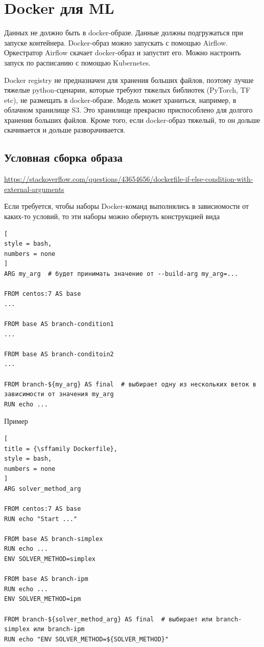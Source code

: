 \documentclass[%
	11pt,
	a4paper,
	utf8,
		]{article}
\begin{document}
\section{Docker для ML}

Данных не должно быть в docker-образе. Данные должны подгружаться при запуске контейнера. Docker-образ можно запускать с помощью Airflow. Оркестратор Airflow скачает docker-образ и запустит его. Можно настроить запуск по расписанию с помощью Kubernetes.

Docker registry не предназначен для хранения больших файлов, поэтому лучше тяжелые python-сценарии, которые требуют тяжелых библиотек (PyTorch, TF etc), не размещать в docker-образе. Модель может храниться, например, в облачном хранилище S3. Это хранилище прекрасно приспособлено для долгого хранения больших файлов. Кроме того, если docker-образ тяжелый, то он дольше скачивается и дольше разворачивается.

\subsection{Условная сборка образа}

\url{https://stackoverflow.com/questions/43654656/dockerfile-if-else-condition-with-external-arguments}

Если требуется, чтобы наборы Docker-команд выполнялись в зависиомости от каких-то условий, то эти наборы можно обернуть конструкцией вида
\begin{lstlisting}[
style = bash,
numbers = none
]
ARG my_arg  # будет принимать значение от --build-arg my_arg=...

FROM centos:7 AS base
...

FROM base AS branch-condition1
...

FROM base AS branch-conditoin2
...

FROM branch-${my_arg} AS final  # выбирает одну из нескольких веток в зависимости от значения my_arg
RUN echo ...
\end{lstlisting}

Пример
\begin{lstlisting}[
title = {\sffamily Dockerfile},
style = bash,
numbers = none
]
ARG solver_method_arg

FROM centos:7 AS base
RUN echo "Start ..."

FROM base AS branch-simplex
RUN echo ...
ENV SOLVER_METHOD=simplex

FROM base AS branch-ipm
RUN echo ...
ENV SOLVER_METHOD=ipm

FROM branch-${solver_method_arg} AS final  # выбирает или branch-simplex или branch-ipm
RUN echo "ENV SOLVER_METHOD=${SOLVER_METHOD}"
\end{lstlisting}
\end{document}
